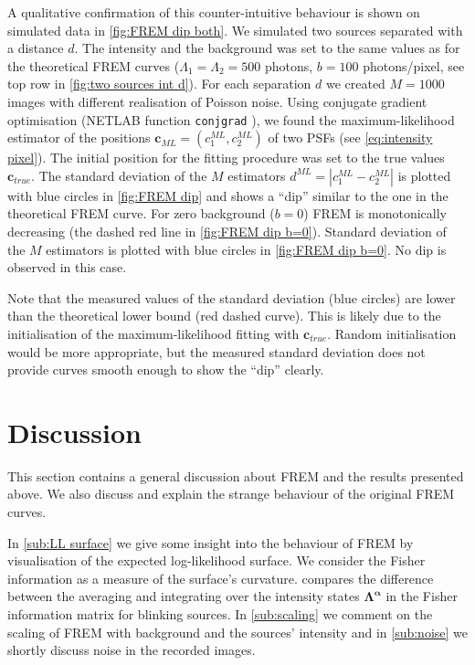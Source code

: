 A qualitative confirmation of this counter-intuitive behaviour is shown on simulated data in \autoref{fig:FREM dip both}. We simulated two sources separated with a distance $d$. The intensity and the background was set to the same values as for the theoretical FREM curves ($\Lambda_1=\Lambda_2=500$ photons, $b=100$ photons/pixel, see top row in \autoref{fig:two sources int d}). For each separation $d$ we created $M=1000$ images with different realisation of Poisson noise. Using conjugate gradient optimisation (NETLAB function {\tt conjgrad} \cite{Nabney}), we found the maximum-likelihood estimator of the positions $\bm{c}_{ML}=(c^{ML}_1,c^{ML}_2)$ of two PSFs (see \autoref{eq:intensity pixel}). The initial position for the fitting procedure was set to the true values $\bm{c}_{true}$. The standard deviation of the $M$ estimators $d^{ML}=|c^{ML}_1-c^{ML}_2|$ is plotted with blue circles in \autoref{fig:FREM dip} and shows a ``dip'' similar to the one in the theoretical FREM curve. For zero background ($b=0$) FREM is monotonically decreasing (the dashed red line in \autoref{fig:FREM dip b=0}). Standard deviation of the $M$ estimators is plotted with blue circles in \autoref{fig:FREM dip b=0}. No dip is observed in this case. 

Note that the measured values of the standard deviation (blue circles) are lower than the theoretical lower bound (red dashed curve). This is likely due to the initialisation of the maximum-likelihood fitting with $\bm{c}_{true}$. Random initialisation would be more appropriate, but the measured standard deviation does not provide curves smooth enough to show the ``dip'' clearly.




\clearpage
\section{Discussion\label{sec:FREM discussion}}

This section contains a general discussion about FREM and the results presented above. We also discuss and explain the strange behaviour of the original FREM curves. 

In \autoref{sub:LL surface} we give some insight into the behaviour of FREM by visualisation of the expected log-likelihood surface. We consider the Fisher information as a measure of the surface's curvature.  compares the difference between the averaging and integrating over the intensity states $\bm{\Lambda^\alpha}$ in the Fisher information matrix for blinking sources. In \autoref{sub:scaling} we comment on the scaling of FREM with background and the sources' intensity and in \autoref{sub:noise} we shortly discuss noise in the recorded images.


